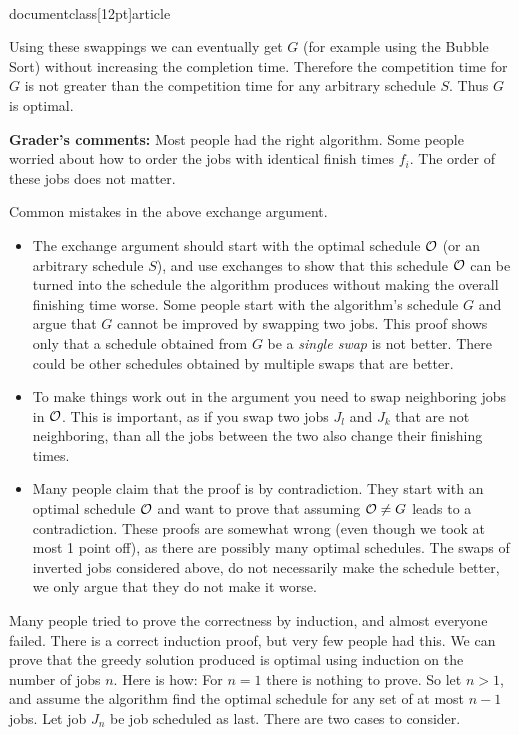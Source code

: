 \\documentclass[12pt]{article}
\begin{document}
\begin{enumerate}
{Using these swappings we can eventually get $G$ (for example using the Bubble Sort)
without increasing the completion time.
Therefore the competition time for $G$ is not greater than
the competition time for any arbitrary schedule $S$.
Thus $G$ is optimal.

\bigskip

{\bf Grader's comments:}
Most people had the right algorithm. Some people worried about how to
order the jobs with identical finish times $f_i$. The order of these
jobs does not matter.

Common mistakes in the above exchange argument.
\begin{itemize}
\item
The exchange argument should start with the optimal schedule ${\cal O}$ (or
an arbitrary schedule $S$), and
use exchanges to show that this schedule ${\cal O}$ can be turned into the
schedule the algorithm produces without making the overall finishing time
worse. Some people start with the algorithm's schedule $G$ and argue that
$G$ cannot be improved by swapping two jobs. This proof shows only that
a schedule obtained from $G$ be a {\em single swap} is not better. There
could be
other schedules obtained by multiple swaps that are better.
\item To make things work out in the argument you need to swap
neighboring jobs in  ${\cal O}$. This is important, as if you swap two jobs
$J_l$ and $J_k$ that are not neighboring, than all the jobs between the two
also change their finishing times.
\item Many people claim that the proof is by contradiction. They start with
an optimal schedule ${\cal O}$ and want to prove that assuming
${\cal O} \neq G$ leads to a contradiction. These proofs are somewhat wrong
(even though we took at most 1 point off), as there are possibly many optimal
schedules. The swaps of inverted jobs considered above, do not necessarily
make the schedule better, we only argue that they do not make it worse.
\end{itemize}

\medskip

Many people tried to prove the correctness by induction, and almost everyone
failed. There is a correct induction proof, but very few people had this.
We can prove that the greedy solution produced is optimal using induction on the
number of jobs $n$. Here is how:
For $n=1$ there is nothing to prove. So let 
$n>1$, and assume the algorithm     
find the optimal schedule for any set of at most $n-1$ jobs.
Let job $J_n$ be job scheduled as last. There are two cases to consider.

}
\end{enumerate}
\end{document}
